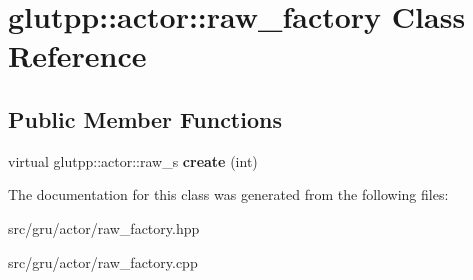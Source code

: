 \hypertarget{classglutpp_1_1actor_1_1raw__factory}{\section{glutpp\-:\-:actor\-:\-:raw\-\_\-factory \-Class \-Reference}
\label{classglutpp_1_1actor_1_1raw__factory}
}
\subsection*{\-Public \-Member \-Functions}
\begin{DoxyCompactItemize}
\item 
\hypertarget{classglutpp_1_1actor_1_1raw__factory_a368ae7729503f9c5a51d5a1bc3a40dfb}{virtual glutpp\-::actor\-::raw\-\_\-s {\bfseries create} (int)}\label{classglutpp_1_1actor_1_1raw__factory_a368ae7729503f9c5a51d5a1bc3a40dfb}

\end{DoxyCompactItemize}


\-The documentation for this class was generated from the following files\-:\begin{DoxyCompactItemize}
\item 
src/gru/actor/raw\-\_\-factory.\-hpp\item 
src/gru/actor/raw\-\_\-factory.\-cpp\end{DoxyCompactItemize}
